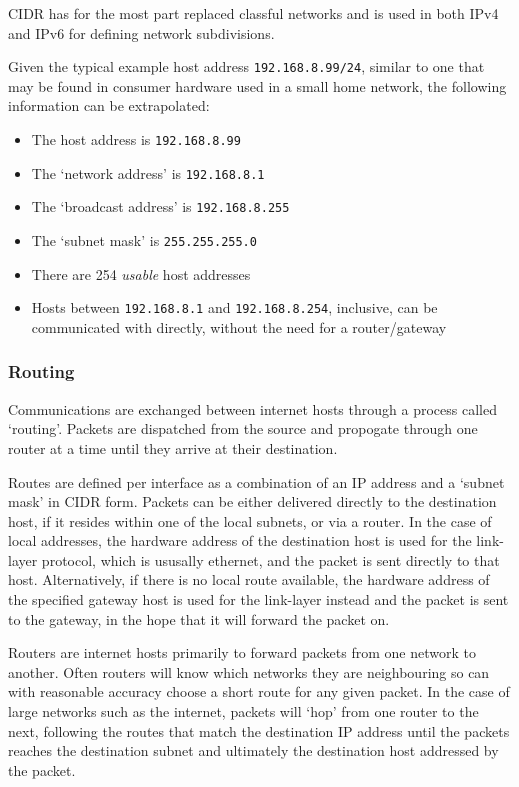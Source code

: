     CIDR has for the most part replaced classful networks and is used in both IPv4 and IPv6 for defining network subdivisions.

        Given the typical example host address \texttt{192.168.8.99/24}, similar to one that may be found in consumer hardware used in a small home network, the following information can be extrapolated:
        \begin{itemize}[noitemsep]
            \item{The host address is \texttt{192.168.8.99}}
            \item{The `network address' is \texttt{192.168.8.1}}
            \item{The `broadcast address' is \texttt{192.168.8.255}}
            \item{The `subnet mask' is \texttt{255.255.255.0}}
            \item{There are 254 \textit{usable} host addresses}
            \item{Hosts between \texttt{192.168.8.1} and \texttt{192.168.8.254}, inclusive, can be communicated with directly, without the need for a router/gateway}
        \end{itemize}

    \subsubsection{Routing}
    Communications are exchanged between internet hosts through a process called `routing'. Packets are dispatched from the source and propogate through one router at a time until they arrive at their destination.

    Routes are defined per interface as a combination of an IP address and a `subnet mask' in CIDR form. Packets can be either delivered directly to the destination host, if it resides within one of the local subnets, or via a router.
    In the case of local addresses, the hardware address of the destination host is used for the link-layer protocol, which is ususally ethernet, and the packet is sent directly to that host.
    Alternatively, if there is no local route available, the hardware address of the specified gateway host is used for the link-layer instead and the packet is sent to the gateway, in the hope that it will forward the packet on.

    Routers are internet hosts primarily to forward packets from one network to another. Often routers will know which networks they are neighbouring so can with reasonable accuracy choose a short route for any given packet. In the case of large networks such as the internet, packets will `hop' from one router to the next, following the routes that match the destination IP address until the packets reaches the destination subnet and ultimately the destination host addressed by the packet.

